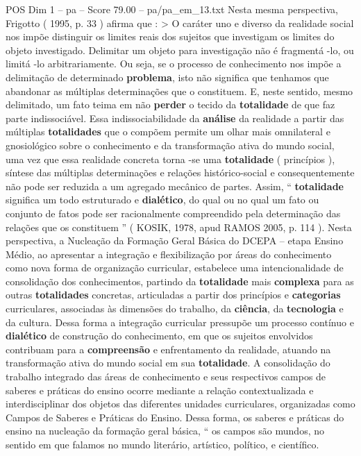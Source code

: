 \begin{textsample}{POS Dim 1 – pa – Score 79.00 – pa/pa\_em\_13.txt}
Nesta mesma perspectiva, Frigotto ( 1995, p. 33 ) afirma que : > O caráter uno e diverso da realidade social nos impõe distinguir os limites reais dos sujeitos que investigam os limites do objeto investigado.
Delimitar um objeto para investigação não é fragmentá -lo, ou limitá -lo arbitrariamente.
Ou seja, se o processo de conhecimento nos impõe a delimitação de determinado \textbf{problema}, isto não significa que tenhamos que abandonar as múltiplas determinações que o constituem.
E, neste sentido, mesmo delimitado, um fato teima em não \textbf{perder} o tecido da \textbf{totalidade} de que faz parte indissociável.
Essa indissociabilidade da \textbf{análise} da realidade a partir das múltiplas \textbf{totalidades} que o compõem permite um olhar mais omnilateral e gnosiológico sobre o conhecimento e da transformação ativa do mundo social, uma vez que essa realidade concreta torna -se uma \textbf{totalidade} ( princípios ), síntese das múltiplas determinações e relações histórico-social e consequentemente não pode ser reduzida a um agregado mecânico de partes.
Assim, “ \textbf{totalidade} significa um todo estruturado e \textbf{dialético}, do qual ou no qual um fato ou conjunto de fatos pode ser racionalmente compreendido pela determinação das relações que os constituem ” ( KOSIK, 1978, apud RAMOS 2005, p. 114 ).
Nesta perspectiva, a Nucleação da Formação Geral Básica do DCEPA – etapa Ensino Médio, ao apresentar a integração e flexibilização por áreas do conhecimento como nova forma de organização curricular, estabelece uma intencionalidade de consolidação dos conhecimentos, partindo da \textbf{totalidade} mais \textbf{complexa} para as outras \textbf{totalidades} concretas, articuladas a partir dos princípios e \textbf{categorias} curriculares, associadas às dimensões do trabalho, da \textbf{ciência}, da \textbf{tecnologia} e da cultura.
Dessa forma a integração curricular pressupõe um processo contínuo e \textbf{dialético} de construção do conhecimento, em que os sujeitos envolvidos contribuam para a \textbf{compreensão} e enfrentamento da realidade, atuando na transformação ativa do mundo social em sua \textbf{totalidade}.
A consolidação do trabalho integrado das áreas de conhecimento e seus respectivos campos de saberes e práticas do ensino ocorre mediante a relação contextualizada e interdisciplinar dos objetos das diferentes unidades curriculares, organizadas como Campos de Saberes e Práticas do Ensino.
Dessa forma, os saberes e práticas do ensino na nucleação da formação geral básica, “ os campos são mundos, no sentido em que falamos no mundo literário, artístico, político, e científico.

\end{textsample}
